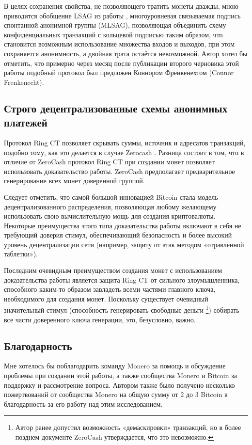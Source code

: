 \documentclass{mrl}
\theoremstyle{definition}
\numberwithin{thm}{section}
\begin{document}
В целях сохранения свойства, не позволяющего тратить монеты дважды, мною приводится обобщение LSAG из работы \cite{LWW}, многоуровневая связываемая подпись спонтанной анонимной группы (MLSAG), позволяющая объединить схему конфиденциальных транзакций с кольцевой подписью таким образом, что становится возможным использование множества входов и выходов, при этом сохраняется анонимность, а двойная трата остаётся невозможной. Автор хотел бы отметить, что примерно через месяц после публикации второго черновика этой работы подобный протокол был предложен Коннором Френкенехтом (Connor Frenkenecht).

\subsection{Строго децентрализованные схемы анонимных платежей}

Протокол Ring CT позволяет скрывать суммы, источник и адресатов транзакций, подобно тому, как это делается в случае Zerocash \cite{Z}. Разница состоит в том, что в отличие от ZeroCash протокол Ring CT при создании монет позволяет использовать доказательство работы. ZeroCash предполагает предварительное генерирование всех монет доверенной группой.

Следует отметить, что самой большой инновацией Bitcoin \cite{SN} стала модель децентрализованного распределения, позволяющая любому желающему использовать свою вычислительную мощь для создания криптовалюты. Некоторые преимущества этого типа доказательства работы включают в себя не требующий доверия стимул, обеспечивающий безопасность и более высокий уровень децентрализации сети (например, защиту от атак методом «отравленной таблетки»).

Последним очевидным преимуществом создания монет с использованием доказательства работы является защита Ring CT от сильного злоумышленника, способного каким-то образом завладеть всеми частями главного ключа, необходимого для создания монет. Поскольку существует очевидный значительный стимул (способность генерировать свободные деньги \footnote{Автор ранее допустил возможность «демаскировки» транзакций, но в более позднем документе ZeroCash утверждается, что это невозможно.}) собирать все части доверенного ключа генерации, это, безусловно, важно.

\subsection{Благодарность}

Мне хотелось бы поблагодарить команду Monero за помощь и обсуждение проблемы при создании этой работы, а также сообщества Monero и Bitcoin за поддержку и рассмотрение вопроса. Автором также было получено несколько пожертвований от сообщества Monero на общую сумму от 2 до 3 Bitcoin в благодарность за его работу над этим исследованием.
\end{document}
